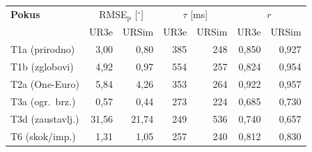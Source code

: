 \begingroup
\setlength{\tabcolsep}{2.2pt}
\begin{tabular}{l rr rr rr}
\hline
\textbf{Pokus} & \multicolumn{2}{c}{RMSE$_\text{p}$ [$^\circ$]} & \multicolumn{2}{c}{$\tau$ [ms]} & \multicolumn{2}{c}{$r$} \\
 & UR3e & URSim & UR3e & URSim & UR3e & URSim \\
\hline
T1a (prirodno) & 3,00 & 0,80 & 385 & 248 & 0,850 & 0,927 \\
T1b (zglobovi) & 4,92 & 0,97 & 554 & 257 & 0,824 & 0,954 \\
T2a (One-Euro) & 5,84 & 4,26 & 353 & 264 & 0,922 & 0,957 \\
T3a (ogr.~brz.) & 0,57 & 0,44 & 273 & 224 & 0,685 & 0,730 \\
T3d (zaustavlj.) & 31,56 & 21,74 & 249 & 536 & 0,740 & 0,657 \\
T6 (skok/imp.) & 1,31 & 1,05 & 257 & 240 & 0,812 & 0,830 \\
\hline
\end{tabular}
\endgroup
